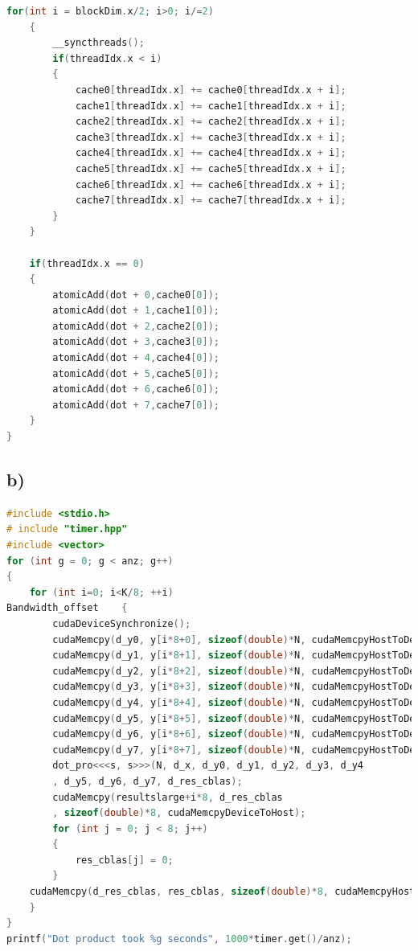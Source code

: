\documentclass[11pt,a4paper]{article}
\begin{document}
\begin{lstlisting}[language=C++, caption={kernel for 1a)}]
	for(int i = blockDim.x/2; i>0; i/=2)
	{
		__syncthreads();
		if(threadIdx.x < i)
		{
			cache0[threadIdx.x] += cache0[threadIdx.x + i];
			cache1[threadIdx.x] += cache1[threadIdx.x + i];
			cache2[threadIdx.x] += cache2[threadIdx.x + i];
			cache3[threadIdx.x] += cache3[threadIdx.x + i];
			cache4[threadIdx.x] += cache4[threadIdx.x + i];
			cache5[threadIdx.x] += cache5[threadIdx.x + i];
			cache6[threadIdx.x] += cache6[threadIdx.x + i];
			cache7[threadIdx.x] += cache7[threadIdx.x + i];
		}
	}

	if(threadIdx.x == 0)
	{
		atomicAdd(dot + 0,cache0[0]);
		atomicAdd(dot + 1,cache1[0]);
		atomicAdd(dot + 2,cache2[0]);
		atomicAdd(dot + 3,cache3[0]);
		atomicAdd(dot + 4,cache4[0]);
		atomicAdd(dot + 5,cache5[0]);
		atomicAdd(dot + 6,cache6[0]);
		atomicAdd(dot + 7,cache7[0]);
	}
}
\end{lstlisting}
\subsection*{b)}
\begin{lstlisting}[language=C++, caption={kernel for 1a)}]
#include <stdio.h>
# include "timer.hpp"
#include <vector>
for (int g = 0; g < anz; g++)
{
	for (int i=0; i<K/8; ++i)
Bandwidth_offset	{
		cudaDeviceSynchronize();
		cudaMemcpy(d_y0, y[i*8+0], sizeof(double)*N, cudaMemcpyHostToDevice);
		cudaMemcpy(d_y1, y[i*8+1], sizeof(double)*N, cudaMemcpyHostToDevice);
		cudaMemcpy(d_y2, y[i*8+2], sizeof(double)*N, cudaMemcpyHostToDevice);
		cudaMemcpy(d_y3, y[i*8+3], sizeof(double)*N, cudaMemcpyHostToDevice);
		cudaMemcpy(d_y4, y[i*8+4], sizeof(double)*N, cudaMemcpyHostToDevice);
		cudaMemcpy(d_y5, y[i*8+5], sizeof(double)*N, cudaMemcpyHostToDevice);
		cudaMemcpy(d_y6, y[i*8+6], sizeof(double)*N, cudaMemcpyHostToDevice);
		cudaMemcpy(d_y7, y[i*8+7], sizeof(double)*N, cudaMemcpyHostToDevice);
		dot_pro<<<s, s>>>(N, d_x, d_y0, d_y1, d_y2, d_y3, d_y4
		, d_y5, d_y6, d_y7, d_res_cblas);
		cudaMemcpy(resultslarge+i*8, d_res_cblas
		, sizeof(double)*8, cudaMemcpyDeviceToHost);
		for (int j = 0; j < 8; j++) 
		{
			res_cblas[j] = 0;
		}
	cudaMemcpy(d_res_cblas, res_cblas, sizeof(double)*8, cudaMemcpyHostToDevice);
	}
}
printf("Dot product took %g seconds", 1000*timer.get()/anz);
\end{lstlisting}
\newpage
\end{document}
